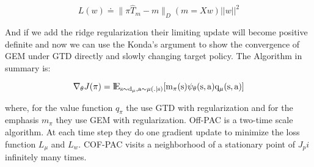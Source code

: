 \begin{equation}
    L(w)\doteq \| \pi \hat{T}_m - m \|_D(m=Xw) ||w||^2
\end{equation}

And if we add the ridge regularization their limiting update will become positive definite and now we can use the Konda's argument to show the convergence of GEM under GTD directly and slowly changing target policy. The Algorithm in summary is: 

 \begin{equation}
     \nabla_\theta J(\pi)=\rm I\!E_{s\sim d_\mu,a \sim \mu(.|s)}[m_{\pi}(s)\psi_\theta(s,a)q_\mu(s,a)]
 \end{equation}

 where, for the value function $q_\pi$ the use GTD with regularization and for the emphasis $m_\pi$ they use GEM with regularization. Off-PAC is a two-time scale algorithm. At each time step they do one gradient update to minimize the loss function $L_\mu$ and $L_w$. COF-PAC visits a neighborhood of a stationary point of $J_pi$ infinitely many times.


